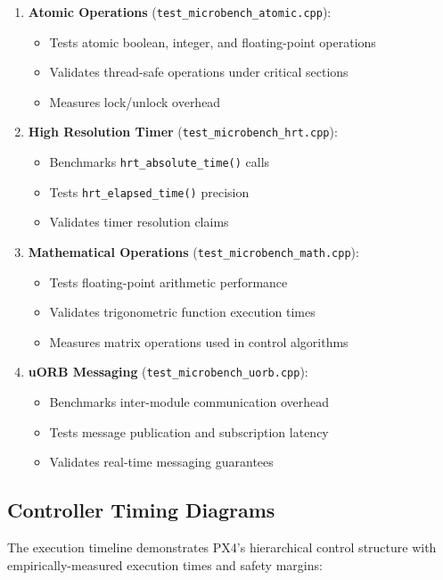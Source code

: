 \documentclass[11pt,a4paper]{article}
\theoremstyle{definition}
\theoremstyle{remark}
\begin{document}
\begin{enumerate}
\item \textbf{Atomic Operations} (\texttt{test\_microbench\_atomic.cpp}):
   \begin{itemize}
   \item Tests atomic boolean, integer, and floating-point operations
   \item Validates thread-safe operations under critical sections
   \item Measures lock/unlock overhead
   \end{itemize}

\item \textbf{High Resolution Timer} (\texttt{test\_microbench\_hrt.cpp}):
   \begin{itemize}
   \item Benchmarks \texttt{hrt\_absolute\_time()} calls
   \item Tests \texttt{hrt\_elapsed\_time()} precision
   \item Validates timer resolution claims
   \end{itemize}

\item \textbf{Mathematical Operations} (\texttt{test\_microbench\_math.cpp}):
   \begin{itemize}
   \item Tests floating-point arithmetic performance
   \item Validates trigonometric function execution times
   \item Measures matrix operations used in control algorithms
   \end{itemize}

\item \textbf{uORB Messaging} (\texttt{test\_microbench\_uorb.cpp}):
   \begin{itemize}
   \item Benchmarks inter-module communication overhead
   \item Tests message publication and subscription latency
   \item Validates real-time messaging guarantees
   \end{itemize}
\end{enumerate}

\subsection{Controller Timing Diagrams}

The execution timeline demonstrates PX4's hierarchical control structure with empirically-measured execution times and safety margins:
\end{document}
